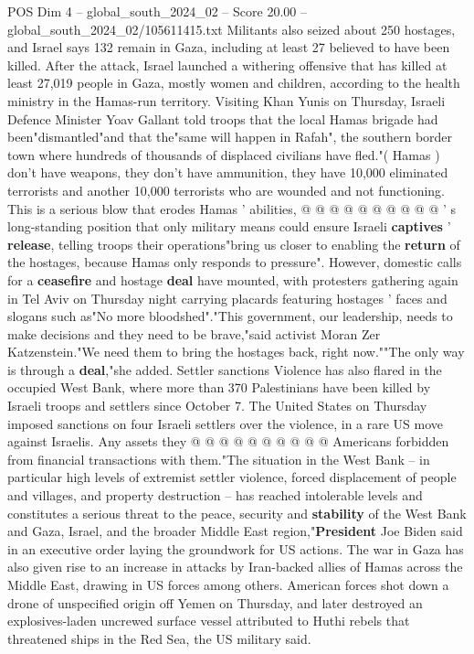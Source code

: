 \begin{textsample}{POS Dim 4 – global\_south\_2024\_02 – Score 20.00 – global\_south\_2024\_02/105611415.txt}
Militants also seized about 250 hostages, and Israel says 132 remain in Gaza, including at least 27 believed to have been killed.
After the attack, Israel launched a withering offensive that has killed at least 27,019 people in Gaza, mostly women and children, according to the health ministry in the Hamas-run territory.
Visiting Khan Yunis on Thursday, Israeli Defence Minister Yoav Gallant told troops that the local Hamas brigade had been"dismantled"and that the"same will happen in Rafah", the southern border town where hundreds of thousands of displaced civilians have fled."( Hamas ) don't have weapons, they don't have ammunition, they have 10,000 eliminated terrorists and another 10,000 terrorists who are wounded and not functioning.
This is a serious blow that erodes Hamas ' abilities, @ @ @ @ @ @ @ @ @ @ ' s long-standing position that only military means could ensure Israeli \textbf{captives} ' \textbf{release}, telling troops their operations"bring us closer to enabling the \textbf{return} of the hostages, because Hamas only responds to pressure".
However, domestic calls for a \textbf{ceasefire} and hostage \textbf{deal} have mounted, with protesters gathering again in Tel Aviv on Thursday night carrying placards featuring hostages ' faces and slogans such as"No more bloodshed"."This government, our leadership, needs to make decisions and they need to be brave,"said activist Moran Zer Katzenstein."We need them to bring the hostages back, right now.""The only way is through a \textbf{deal},"she added.
Settler sanctions Violence has also flared in the occupied West Bank, where more than 370 Palestinians have been killed by Israeli troops and settlers since October 7.
The United States on Thursday imposed sanctions on four Israeli settlers over the violence, in a rare US move against Israelis.
Any assets they @ @ @ @ @ @ @ @ @ @ Americans forbidden from financial transactions with them."The situation in the West Bank -- in particular high levels of extremist settler violence, forced displacement of people and villages, and property destruction -- has reached intolerable levels and constitutes a serious threat to the peace, security and \textbf{stability} of the West Bank and Gaza, Israel, and the broader Middle East region,"\textbf{President} Joe Biden said in an executive order laying the groundwork for US actions.
The war in Gaza has also given rise to an increase in attacks by Iran-backed allies of Hamas across the Middle East, drawing in US forces among others.
American forces shot down a drone of unspecified origin off Yemen on Thursday, and later destroyed an explosives-laden uncrewed surface vessel attributed to Huthi rebels that threatened ships in the Red Sea, the US military said.

\end{textsample}
